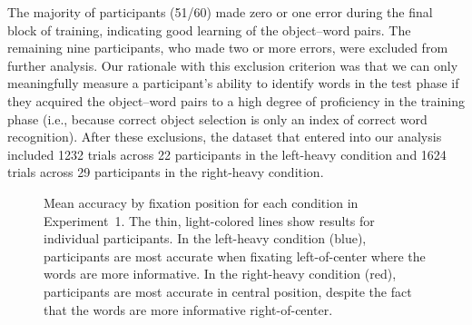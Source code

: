 \documentclass[doc,biblatex,floatsintext]{apa7}
\begin{document}
The majority of participants (51/60) made zero or one error during the final block of training, indicating good learning of the object--word pairs. The remaining nine participants, who made two or more errors, were excluded from further analysis. Our rationale with this exclusion criterion was that we can only meaningfully measure a participant's ability to identify words in the test phase if they acquired the object--word pairs to a high degree of proficiency in the training phase (i.e., because correct object selection is only an index of correct word recognition). After these exclusions, the dataset that entered into our analysis included 1232 trials across 22 participants in the left-heavy condition and 1624 trials across 29 participants in the right-heavy condition.

\begin{figure}
\vspace*{2pt}
\caption{Mean accuracy by fixation position for each condition in Experiment~1. The thin, light-colored lines show results for individual participants. In the left-heavy condition (blue), participants are most accurate when fixating left-of-center where the words are more informative. In the right-heavy condition (red), participants are most accurate in central position, despite the fact that the words are more informative right-of-center.}
\label{fig05}
\end{figure}
\end{document}
